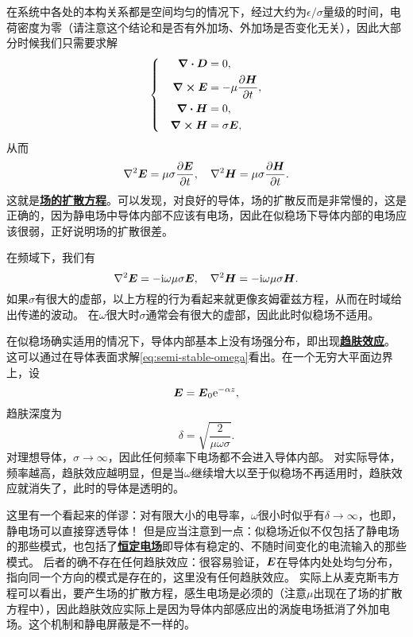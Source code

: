 \documentclass[UTF8, a4paper]{ctexart}
\newcommand*{\ee}{\mathrm{e}}
\newcommand*{\ii}{\mathrm{i}}
\newcommand*{\concept}[1]{\underline{\textbf{#1}}}
\newenvironment{bigcase}{\left\{\quad\begin{aligned}}{\end{aligned}\right.}
\begin{document}

在系统中各处的本构关系都是空间均匀的情况下，经过大约为$\epsilon/\sigma$量级的时间，电荷密度为零（请注意这个结论和是否有外加场、外加场是否变化无关），因此大部分时候我们只需要求解
\[
    \begin{bigcase}
        \div{\vb*{D}} &= 0, \\
        \curl{\vb*{E}} &= - \mu \pdv{\vb*{H}}{t}, \\
        \div{\vb*{H}} &= 0, \\
        \curl{\vb*{H}} &= \sigma \vb*{E},
    \end{bigcase}
\]
从而
\begin{equation}
    \laplacian{\vb*{E}} = \mu \sigma \pdv{\vb*{E}}{t}, \quad \laplacian{\vb*{H}} = \mu \sigma \pdv{\vb*{H}}{t}.
\end{equation}
这就是\concept{场的扩散方程}。可以发现，对良好的导体，场的扩散反而是非常慢的，这是正确的，因为静电场中导体内部不应该有电场，因此在似稳场下导体内部的电场应该很弱，正好说明场的扩散很差。

在频域下，我们有
\begin{equation}
    \laplacian{\vb*{E}} = - \ii \omega \mu \sigma \vb*{E}, \quad \laplacian{\vb*{H}} = - \ii \omega \mu \sigma \vb*{H}.
    \label{eq:semi-stable-omega}
\end{equation}
如果$\sigma$有很大的虚部，以上方程的行为看起来就更像亥姆霍兹方程，从而在时域给出传递的波动。
在$\omega$很大时$\sigma$通常会有很大的虚部，因此此时似稳场不适用。

在似稳场确实适用的情况下，导体内部基本上没有场强分布，即出现\concept{趋肤效应}。
这可以通过在导体表面求解\eqref{eq:semi-stable-omega}看出。在一个无穷大平面边界上，设
\begin{equation}
    \vb*{E} = \vb*{E}_0 \ee^{-\alpha z},
    \label{eq:damping-surface-field}
\end{equation}
趋肤深度为
\begin{equation}
    \delta = \sqrt{\frac{2}{\mu \omega \sigma}}.
\end{equation}
对理想导体，$\sigma \to \infty$，因此任何频率下电场都不会进入导体内部。
对实际导体，频率越高，趋肤效应越明显，但是当$\omega$继续增大以至于似稳场不再适用时，趋肤效应就消失了，此时的导体是透明的。

这里有一个看起来的佯谬：对有限大小的电导率，$\omega$很小时似乎有$\delta \to \infty$，也即，静电场可以直接穿透导体！
但是应当注意到一点：似稳场近似不仅包括了静电场的那些模式，也包括了\concept{恒定电场}即导体有稳定的、不随时间变化的电流输入的那些模式。
后者的确不存在任何趋肤效应：很容易验证，$\vb*{E}$在导体内处处均匀分布，指向同一个方向的模式是存在的，这里没有任何趋肤效应。
实际上从麦克斯韦方程可以看出，要产生场的扩散方程，感生电场是必须的（注意$\mu$出现在了场的扩散方程中），因此趋肤效应实际上是因为导体内部感应出的涡旋电场抵消了外加电场。这个机制和静电屏蔽是不一样的。
\end{document}
